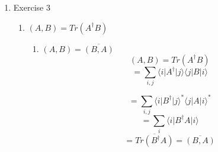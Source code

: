 \documentclass[12pt]{article}
\newcommand{\ket}[1]{\vert{#1}\rangle}
\newcommand{\bra}[1]{\langle{#1}\vert}
\begin{document}
\begin{enumerate}
\begin{enumerate}
\end{enumerate}



\item Exercise 3
\begin{enumerate}
    \item $(A,B) = Tr(A^\dagger B) $ %
    \begin{enumerate}
        \item $(A,B) = \overline{(B,A)}$ 
        $$ (A,B) = Tr(A^\dagger B) $$
        $$ = \sum_{i,j} \bra{i}A^\dagger \ket{j} \bra{j}B\ket{i} $$
        
        $$ = \sum_{i,j} \bra{i}B^\dagger \ket{j} ^* \bra{j}A\ket{i}^* $$
        $$ = \sum_i \bra{i} B^\dagger A \ket{i} $$
        $$ = \overline{Tr(B^\dagger A)} = \overline{(B,A)} $$


\end{enumerate}
\end{enumerate}
\end{enumerate}
\end{document}
